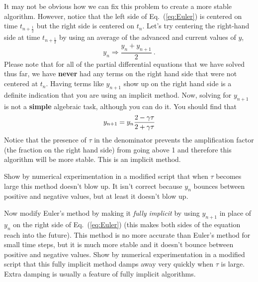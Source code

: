 \begin{enumerate}
\begin{enumerate}
  It may not be obvious how we can fix this problem to create a more
  stable algorithm.  However, notice that the left side of Eq.~(\ref{eq:Euler})
    is centered on time $t_{n+\frac{1}{2}}$ but the
    right side is centered on $t_n$. Let's try centering 
    the right-hand side at time $t_{n+\frac{1}{2}}$ by
    using an average of the advanced and current values
    of $y$,
    \[
        y_n \Rightarrow \frac{y_n + y_{n+1} }{2} ~.
    \]
    Please note that for all of the partial differential equations
    that we have solved thus far, we have \textbf{never} had any terms on the
    right hand side that were not centered at $t_n$.  Having terms
    like $y_{n+1}$ show up on the right hand side is a definite
    indication that you are using an implicit method.  Now, solving
    for $y_{n+1}$ is not a \textbf{simple} algebraic task, although
    you can do it.  You should find that
\begin{equation}\label{eq:partialImplicit}
y_{n+1} = y_n { 2 - \gamma  \tau \over 2 + \gamma  \tau}
\end{equation}
    Notice that the presence of $\tau$ in the denominator prevents the
    amplification factor (the fraction on the right hand side) from
    going above 1 and therefore this algorithm will be more stable.
    This is an implicit method.

    Show by numerical experimentation in a modified script that when
    $\tau$ becomes large this method doesn't blow up. It isn't correct
    because $y_n$ bounces between positive and negative values, but at
    least it doesn't blow up.

\subprob \label{P:8.1c} 

    Now modify Euler's method by making it {\it fully
    implicit} by using $y_{n+1}$ in place of $y_n$ on the
    right side of Eq.~(\ref{eq:Euler}) (this makes both sides
    of the equation reach into the future). This method is no
    more accurate than Euler's method for small time steps,
    but it is much more stable and it doesn't bounce between
    positive and negative values. Show by numerical
    experimentation in a modified script that this fully
    implicit method damps away very quickly when $\tau$ is
    large. Extra damping is usually a feature of fully
    implicit algorithms.
\end{enumerate}
\end{enumerate}
